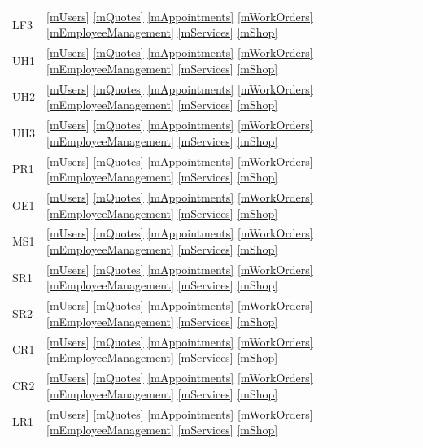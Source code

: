 \documentclass[12pt, titlepage]{article}
\begin{document}
\begin{longtable}{p{} p{}}
	LF3                   & \ref{mUsers} \ref{mQuotes} \ref{mAppointments} \ref{mWorkOrders} \ref{mEmployeeManagement} \ref{mServices} \ref{mShop} \\
	UH1                   & \ref{mUsers} \ref{mQuotes} \ref{mAppointments} \ref{mWorkOrders} \ref{mEmployeeManagement} \ref{mServices} \ref{mShop} \\
	UH2                   & \ref{mUsers} \ref{mQuotes} \ref{mAppointments} \ref{mWorkOrders} \ref{mEmployeeManagement} \ref{mServices} \ref{mShop} \\
	UH3                   & \ref{mUsers} \ref{mQuotes} \ref{mAppointments} \ref{mWorkOrders} \ref{mEmployeeManagement} \ref{mServices} \ref{mShop} \\
	PR1                   & \ref{mUsers} \ref{mQuotes} \ref{mAppointments} \ref{mWorkOrders} \ref{mEmployeeManagement} \ref{mServices} \ref{mShop} \\
	OE1                   & \ref{mUsers} \ref{mQuotes} \ref{mAppointments} \ref{mWorkOrders} \ref{mEmployeeManagement} \ref{mServices} \ref{mShop} \\
	MS1                   & \ref{mUsers} \ref{mQuotes} \ref{mAppointments} \ref{mWorkOrders} \ref{mEmployeeManagement} \ref{mServices} \ref{mShop} \\
	SR1                   & \ref{mUsers} \ref{mQuotes} \ref{mAppointments} \ref{mWorkOrders} \ref{mEmployeeManagement} \ref{mServices} \ref{mShop} \\
	SR2                   & \ref{mUsers} \ref{mQuotes} \ref{mAppointments} \ref{mWorkOrders} \ref{mEmployeeManagement} \ref{mServices} \ref{mShop} \\
	CR1                   & \ref{mUsers} \ref{mQuotes} \ref{mAppointments} \ref{mWorkOrders} \ref{mEmployeeManagement} \ref{mServices} \ref{mShop} \\
	CR2                   & \ref{mUsers} \ref{mQuotes} \ref{mAppointments} \ref{mWorkOrders} \ref{mEmployeeManagement} \ref{mServices} \ref{mShop} \\
	LR1                   & \ref{mUsers} \ref{mQuotes} \ref{mAppointments} \ref{mWorkOrders} \ref{mEmployeeManagement} \ref{mServices} \ref{mShop} \\
	\bottomrule
\end{longtable}
\end{document}
